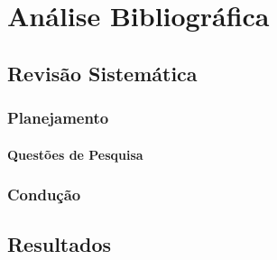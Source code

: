 \chapter[Análise Bibliográfica]{Análise Bibliográfica}

  \section[Revisão Sistemática]{Revisão Sistemática}
    \subsection[Planejamento]{Planejamento}
      \subsubsection[Questões de Pesquisa]{Questões de Pesquisa}

    \subsection[Condução]{Condução}

  \section[Resultados]{Resultados}
